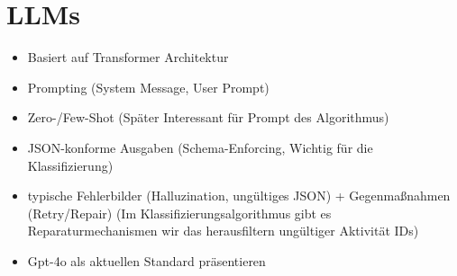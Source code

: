 \section{LLMs}\label{sec:llms}

\begin{itemize}
    \item Basiert auf Transformer Architektur
    \item Prompting (System Message, User Prompt)
    \item Zero-/Few-Shot (Später Interessant für Prompt des Algorithmus)
    \item JSON-konforme Ausgaben (Schema-Enforcing, Wichtig für die Klassifizierung)
    \item typische Fehlerbilder (Halluzination, ungültiges JSON) + Gegenmaßnahmen (Retry/Repair) (Im Klassifizierungsalgorithmus gibt es Reparaturmechanismen wir das herausfiltern ungültiger Aktivität IDs)
    \item Gpt-4o als aktuellen Standard präsentieren
\end{itemize}